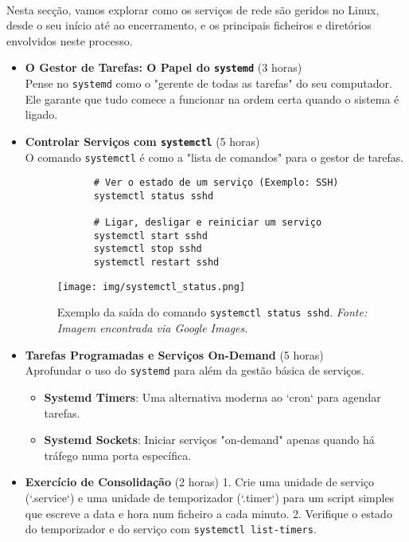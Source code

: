 \documentclass[10pt,a4paper]{article}
\begin{document}
	\paragraph{}
	Nesta secção, vamos explorar como os serviços de rede são geridos no Linux, desde o seu início até ao encerramento, e os principais ficheiros e diretórios envolvidos neste processo.
	
	\begin{itemize}
		\item \textbf{O Gestor de Tarefas: O Papel do \texttt{systemd}} (3 horas) \\
		Pense no \texttt{systemd} como o "gerente de todas as tarefas" do seu computador. Ele garante que tudo comece a funcionar na ordem certa quando o sistema é ligado.
		
		\item \textbf{Controlar Serviços com \texttt{systemctl}} (5 horas) \\
		O comando \texttt{systemctl} é como a "lista de comandos" para o gestor de tarefas.
		\begin{verbatim}
			# Ver o estado de um serviço (Exemplo: SSH)
			systemctl status sshd
			
			# Ligar, desligar e reiniciar um serviço
			systemctl start sshd
			systemctl stop sshd
			systemctl restart sshd
		\end{verbatim}
		
		\begin{figure}[h]
			\centering
			\texttt{[image: img/systemctl\_status.png]}
			\caption{Exemplo da saída do comando \texttt{systemctl status sshd}. \textit{Fonte: Imagem encontrada via Google Images.}}
			\label{fig:systemctl_status}
		\end{figure}
		
		\item \textbf{Tarefas Programadas e Serviços On-Demand} (5 horas) \\
		Aprofundar o uso do \texttt{systemd} para além da gestão básica de serviços.
		\begin{itemize}
			\item \textbf{Systemd Timers}: Uma alternativa moderna ao `cron` para agendar tarefas.
			\item \textbf{Systemd Sockets}: Iniciar serviços "on-demand" apenas quando há tráfego numa porta específica.
		\end{itemize}
		
		\item \textbf{Exercício de Consolidação} (2 horas)
		1. Crie uma unidade de serviço (`.service`) e uma unidade de temporizador (`.timer`) para um script simples que escreve a data e hora num ficheiro a cada minuto.
		2. Verifique o estado do temporizador e do serviço com \texttt{systemctl list-timers}.
	\end{itemize}
	
\end{document}
